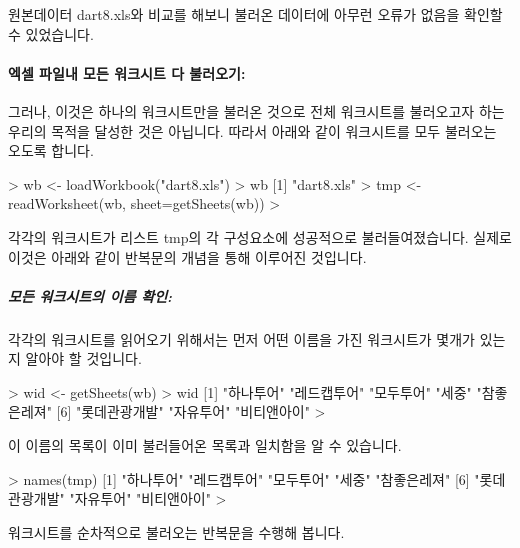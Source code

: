 원본데이터 dart8.xls와 비교를 해보니 불러온 데이터에 아무런 오류가 없음을 확인할 수 있었습니다.


\paragraph{엑셀 파일내 모든 워크시트 다 불러오기:} 
그러나, 이것은 하나의 워크시트만을 불러온 것으로 전체 워크시트를 불러오고자 하는 우리의 목적을 달성한 것은 아닙니다.
따라서 아래와 같이 워크시트를 모두 불러오는 오도록 합니다.

\begin{Schunk}
\begin{Soutput}
> wb <- loadWorkbook("dart8.xls")
> wb
[1] "dart8.xls"
> tmp <- readWorksheet(wb, sheet=getSheets(wb))
>
\end{Soutput}
\end{Schunk}

각각의 워크시트가 리스트 tmp의 각 구성요소에 성공적으로 불러들여졌습니다. 
실제로 이것은 아래와 같이 반복문의 개념을 통해 이루어진 것입니다.

\subparagraph{모든 워크시트의 이름 확인:} 
각각의 워크시트를 읽어오기 위해서는 먼저 어떤 이름을 가진 워크시트가 몇개가 있는지 알아야 할 것입니다.

\begin{Schunk}
\begin{Soutput}
> wid <- getSheets(wb)
> wid
[1] "하나투어"     "레드캡투어"   "모두투어"     "세중"         "참좋은레져"  
[6] "롯데관광개발" "자유투어"     "비티앤아이"  
> 
\end{Soutput}
\end{Schunk}

이 이름의 목록이 이미 불러들어온 목록과 일치함을 알 수 있습니다.

\begin{Schunk}
\begin{Soutput}
> names(tmp)
[1] "하나투어"     "레드캡투어"   "모두투어"     "세중"         "참좋은레져"  
[6] "롯데관광개발" "자유투어"     "비티앤아이"  
> 
\end{Soutput}
\end{Schunk}

워크시트를 순차적으로 불러오는 반복문을 수행해 봅니다.

